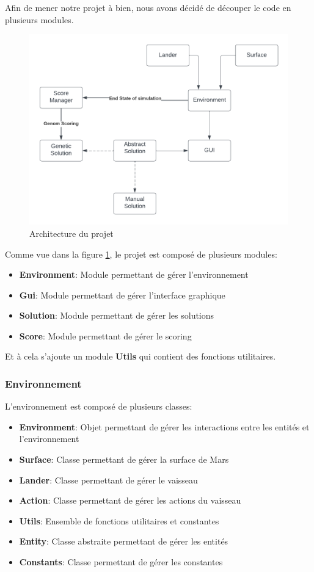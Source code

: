 \documentclass[french,a4paper,10pt,twocolumn]{article}
\begin{document}
Afin de mener notre projet à bien, nous avons décidé de découper le code en plusieurs modules.
\begin{figure}[h]
    \centering
    \includegraphics[scale=0.5]{images/class_diagram.png}
    \caption{Architecture du projet}\label{fig:architecture}

\end{figure}


Comme vue dans la figure \ref{fig:architecture}, le projet est composé de plusieurs modules:
\begin{itemize}
    \item \textbf{Environment}: Module permettant de gérer l'environnement
    \item \textbf{Gui}: Module permettant de gérer l'interface graphique
    \item \textbf{Solution}: Module permettant de gérer les solutions
    \item \textbf{Score}: Module permettant de gérer le scoring
\end{itemize}
Et à cela s'ajoute un module \textbf{Utils} qui contient des fonctions utilitaires.

\subsubsection{Environnement}

L'environnement est composé de plusieurs classes:
\begin{itemize}
    \item \textbf{Environment}: Objet permettant de gérer les interactions entre les entités et l'environnement
    \item \textbf{Surface}: Classe permettant de gérer la surface de Mars
    \item \textbf{Lander}: Classe permettant de gérer le vaisseau
    \item \textbf{Action}: Classe permettant de gérer les actions du vaisseau
    \item \textbf{Utils}: Ensemble de fonctions utilitaires et constantes 
    \item \textbf{Entity}: Classe abstraite permettant de gérer les entités
    \item \textbf{Constants}: Classe permettant de gérer les constantes
\end{itemize}
\end{document}
